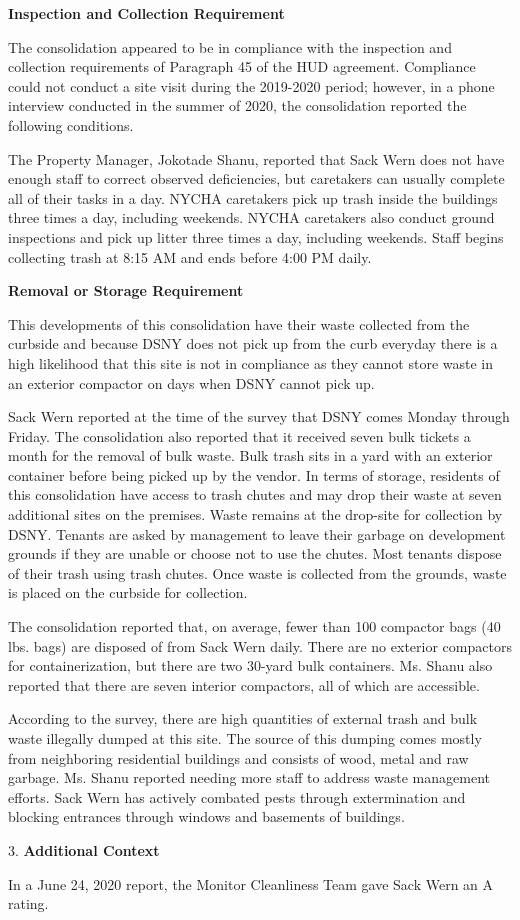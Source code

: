 

\textbf{Inspection and Collection Requirement}

The consolidation appeared to be in compliance with the inspection and collection requirements of Paragraph 45 of the HUD agreement. Compliance could not conduct a site visit during the 2019-2020 period; however, in a phone interview conducted in the summer of 2020, the consolidation reported the following conditions.

The Property Manager, Jokotade Shanu, reported that Sack Wern does not have enough staff to correct observed deficiencies, but caretakers can usually complete all of their tasks in a day. NYCHA caretakers pick up trash inside the buildings three times a day, including weekends. NYCHA caretakers also conduct ground inspections and pick up litter three times a day, including weekends. Staff begins collecting trash at 8:15 AM  and ends before 4:00 PM daily. 

\textbf{Removal or Storage Requirement}

This developments of this consolidation have their waste collected from the curbside and because DSNY does not pick up from the curb everyday there is a high likelihood that this site is not in compliance as they cannot store waste in an exterior compactor on days when DSNY cannot pick up.

Sack Wern reported at the time of the survey that DSNY comes Monday through Friday. The consolidation also reported that it received seven bulk tickets a month for the removal of bulk waste. Bulk trash sits in a yard with an exterior container before being picked up by the vendor. In terms of storage, residents of this consolidation have access to trash chutes and may drop their waste at seven additional sites on the premises. Waste remains at the drop-site for collection by DSNY. Tenants are asked by management to leave their garbage on development grounds if they are unable or choose not to use the chutes. Most tenants dispose of their trash using trash chutes. Once waste is collected from the grounds, waste is placed on the curbside for collection. 

The consolidation reported that, on average, fewer than 100 compactor bags (40 lbs. bags) are disposed of from Sack Wern daily. There are no exterior compactors for containerization, but there are two 30-yard bulk containers. Ms. Shanu also reported that there are seven interior compactors, all of which are accessible. 

According to the survey, there are high quantities of external trash and bulk waste illegally dumped at this site. The source of this dumping comes mostly from neighboring residential buildings and consists of wood, metal and raw garbage. Ms. Shanu reported needing more staff to address waste management efforts. Sack Wern has actively combated pests through extermination and blocking entrances through windows and basements of buildings.

3. \textbf{Additional Context} 

In a June 24, 2020 report, the Monitor Cleanliness Team gave Sack Wern an A rating. 